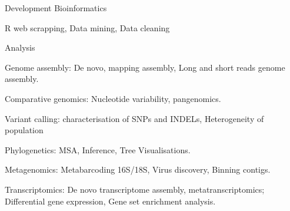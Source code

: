 \begin{cventries}
  \cventry
    {Development} %
    {Bioinformatics} %
    {} %
    {} %
    {
      \begin{cvitems} %
        \item {R web scrapping, Data mining, Data cleaning }
      \end{cvitems}
    }

  \cventry
    {Analysis} %
    {} %
    {} %
    {} %
    {
      \begin{cvitems} %
        \item {Genome assembly: De novo, mapping assembly, Long and short reads genome assembly.}
        \item {Comparative genomics: Nucleotide variability, pangenomics.}
        \item {Variant calling:  characterisation of SNPs and INDELs, Heterogeneity of population}
        \item {Phylogenetics: MSA, Inference, Tree Visualisations.}
        \item {Metagenomics: Metabarcoding 16S/18S, Virus discovery, Binning contigs.}
        \item {Transcriptomics: De novo transcriptome assembly, metatranscriptomics; Differential gene expression, Gene set enrichment analysis.}
      \end{cvitems}
    }


\end{cventries}